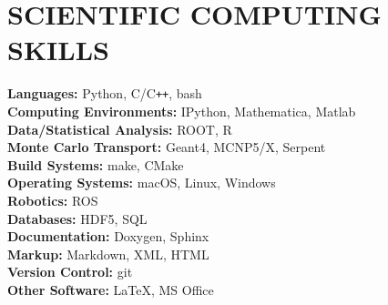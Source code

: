 \section{\small{SCIENTIFIC COMPUTING \\ SKILLS}}

\textbf{Languages:} \hfill Python, C/C\verb!++!, bash\\
\textbf{Computing Environments:} \hfill IPython, Mathematica, Matlab \\
\textbf{Data/Statistical Analysis:} \hfill ROOT, R\\
\textbf{Monte Carlo Transport:} \hfill Geant4, MCNP5/X, Serpent\\
\textbf{Build Systems:} \hfill make, CMake\\
\textbf{Operating Systems:} \hfill macOS, Linux, Windows\\
\textbf{Robotics:} \hfill ROS\\
\textbf{Databases:} \hfill HDF5, SQL\\
\textbf{Documentation:} \hfill Doxygen, Sphinx\\
\textbf{Markup:} \hfill Markdown, XML, HTML\\
\textbf{Version Control:} \hfill git\\
\textbf{Other Software:} \hfill \LaTeX, MS Office

%
